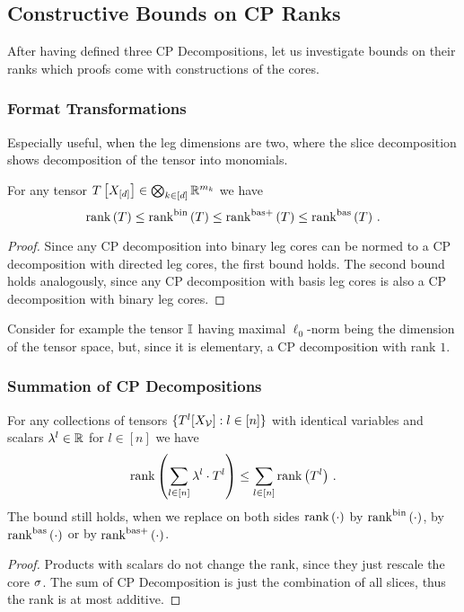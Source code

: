 \subsection{Constructive Bounds on CP Ranks}

After having defined three CP Decompositions, let us investigate bounds on their ranks which proofs come with constructions of the cores.


\subsubsection{Format Transformations}

Especially useful, when the leg dimensions are two, where the slice decomposition shows decomposition of the tensor into monomials.


\begin{theorem}\label{the:sliceToCP}
	For any tensor $T\left[X_{[d]}\right]\in\bigotimes_{k\in[d]} \mathbb{R}^{m_{k}}$ we have
		\[ \mathrm{rank}\left(T\right) 
		\leq \mathrm{rank}^{\mathrm{bin}}\left(T\right) 
		\leq \mathrm{rank}^{\mathrm{bas+}}\left(T\right) 
		\leq \mathrm{rank}^{\mathrm{bas}}\left(T\right) \, . \]
\end{theorem}	
\begin{proof}
	Since any CP decomposition into binary leg cores can be normed to a CP decomposition with directed leg cores, the first bound holds.
	The second bound holds analogously, since any CP decomposition with basis leg cores is also a CP decomposition with binary leg cores.
\end{proof}


Consider for example the tensor $\mathbb{I}$ having maximal $\ell_0$-norm being the dimension of the tensor space, but, since it is elementary, a CP decomposition with rank $1$.


\subsubsection{Summation of CP Decompositions}

\begin{theorem}\label{the:CPrankSumBound}
	For any collections of tensors $\{T^{l}[X_{\mathcal{V}}] : l \in [n]\}$ with identical variables and scalars $\lambda^{l} \in \mathbb{R}$ for $l\in[n]$  we have
		\[ \mathrm{rank}\left(\sum_{l \in [n]} \lambda^{l} \cdot T^{l}\right) \leq \sum_{l\in[n]}  \mathrm{rank}\left(T^{l}\right)  \, . \]
	The bound still holds, when we replace on both sides $\mathrm{rank}\left(\cdot\right)$ by $\mathrm{rank}^{\mathrm{bin}}\left(\cdot\right)$, by $\mathrm{rank}^{\mathrm{bas}}\left(\cdot\right)$ or by $\mathrm{rank}^{\mathrm{bas+}}\left(\cdot\right)$.
\end{theorem}
\begin{proof}
	Products with scalars do not change the rank, since they just rescale the core $\sigma$.
	The sum of CP Decomposition is just the combination of all slices, thus the rank is at most additive.
\end{proof}

